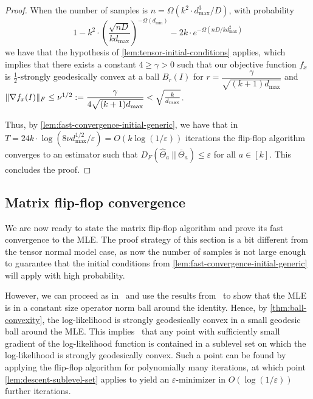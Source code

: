 \documentclass[aos]{imsart}
\theoremstyle{definition}
\numberwithin{equation}{section}
\DeclarePairedDelimiter{\norm}{\lVert}{\rVert}
\newcommand{\otheta}{\overline{\Theta}}
\newcommand{\htheta}{\widehat{\Theta}}
\newcommand{\eps}{\varepsilon}
\def\dmin{d_{\min}}
\def\dmax{d_{\max}}
\begin{document}
\begin{proof}
	When the number of samples is $n = \Omega(k^2 \cdot \dmax^3/D)$, with probability 
	$$ 1 - k^2 \cdot \left( \dfrac{\sqrt{nD}}{k \dmax} \right)^{-\Omega(\dmin)} - 2k \cdot e^{- \Omega(nD/k \dmax^2)}$$ 
	we have that the hypothesis of \cref{lem:tensor-initial-conditions} applies, which implies that there exists a constant $4 \geq \gamma > 0$ such that our objective function $f_x$ is $\frac{1}{2}$-strongly geodesically convex at a ball $B_r(I)$ for $r = \dfrac{\gamma}{\sqrt{(k+1)\dmax}}$ and $\norm{\nabla f_x(I)}_F \leq \nu^{1/2}:=\dfrac{\gamma}{4 \sqrt{(k+1)\dmax}} < \sqrt{\frac{k}{\dmax}}$.
	
Thus, by \cref{lem:fast-convergence-initial-generic}, we have that in $T = 24k \cdot \log(8 \nu \dmax^{1/2}/\eps) = O(k \log( 1/\eps))$ iterations the flip-flop algorithm converges to an estimator such that $D_F(\htheta_a \ || \ \otheta_a) \leq \eps$ for all $a \in [k]$. This concludes the proof.
\end{proof}

\newpage
\subsection{Matrix flip-flop convergence}

We are now ready to state the matrix flip-flop algorithm and prove its fast convergence to the MLE. 
The proof strategy of this section is a bit different from the tensor normal model case, as now the number of samples is not large enough to guarantee that the initial conditions from \cref{lem:fast-convergence-initial-generic} will apply with high probability.

However, we can proceed as in~\cite{FM20} and use the results from~\cite{KLR19} to show that the MLE is in a constant size operator norm ball around the identity. Hence, by \cref{thm:ball-convexity}, the log-likelihood is strongly geodesically convex in a small geodesic ball around the MLE. This implies~\cite[Lemma 4.7]{FM20} that any point with sufficiently small gradient of the log-likelihood function is contained in a sublevel set on which the log-likelihood is strongly geodesically convex. Such a point can be found by applying the flip-flop algorithm for polynomially many iterations, at which point \cref{lem:descent-sublevel-set} applies to yield an $\varepsilon$-minimizer in $O(\log(1/\varepsilon))$ further iterations.
\end{document}
